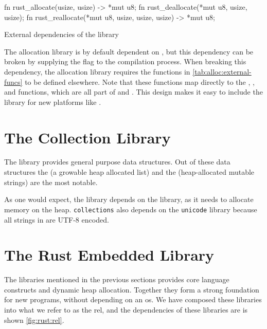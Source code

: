 \begin{listing}[H]
  \begin{rustcode}
fn rust_allocate(usize, usize) -> *mut u8;
fn rust_deallocate(*mut u8, usize, usize);
fn rust_reallocate(*mut u8, usize, usize, usize) -> *mut u8;
  \end{rustcode}
  \caption{External dependencies of the  library}
  \label{tab:alloc:external-funcs}
\end{listing}

The allocation library is by default dependent on , but this dependency can be broken by supplying the  flag to the compilation process.
When breaking this dependency, the allocation library requires the functions in \autoref{tab:alloc:external-funcs} to be defined elsewhere.
Note that these functions map directly to the , , and  functions, which are all part of  and {\newlib}.
This design makes it easy to include the {} library for new platforms like {\rg}.

\section{The Collection Library}

The {\rust}  library provides general purpose data structures.
Out of these data structures the  (a growable heap allocated list) and the  (heap-allocated mutable strings) are the most notable.

As one would expect, the  library depends on the  library, as it needs to allocate memory on the heap.
\texttt{collections} also depends on the \texttt{unicode} library because all strings in {\rust} are UTF-8 encoded.

\section{The Rust Embedded Library}
\label{sec:rel}

The libraries mentioned in the previous sections provides core language constructs and dynamic heap allocation.
Together they form a strong foundation for new {\rust} programs, without depending on an \gls{os}.
We have composed these libraries into what we refer to as the \gls{rel}, and the dependencies of these libraries are is shown \autoref{fig:rust:rel}.

